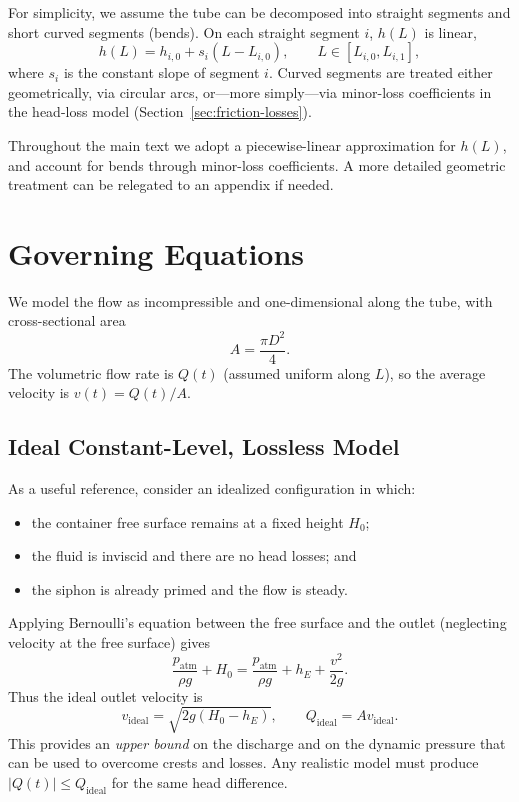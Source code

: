 \documentclass[11pt]{article}
\begin{document}
For simplicity, we assume the tube can be decomposed into straight segments and short curved segments (bends).
On each straight segment $i$, $h(L)$ is linear,
\begin{equation}
  h(L) = h_{i,0} + s_i (L - L_{i,0}), \qquad L \in [L_{i,0}, L_{i,1}],
\end{equation}
where $s_i$ is the constant slope of segment $i$.
Curved segments are treated either geometrically, via circular arcs, or---more simply---via minor-loss coefficients in the head-loss model (Section~\ref{sec:friction-losses}).

Throughout the main text we adopt a piecewise-linear approximation for $h(L)$, and account for bends through minor-loss coefficients.
A more detailed geometric treatment can be relegated to an appendix if needed.

\section{Governing Equations}
\label{sec:governing-equations}

We model the flow as incompressible and one-dimensional along the tube, with cross-sectional area
\begin{equation}
  A = \frac{\pi D^2}{4}.
\end{equation}
The volumetric flow rate is $Q(t)$ (assumed uniform along $L$), so the average velocity is $v(t) = Q(t)/A$.

\subsection{Ideal Constant-Level, Lossless Model}
\label{sec:ideal-model}

As a useful reference, consider an idealized configuration in which:
\begin{itemize}
  \item the container free surface remains at a fixed height $H_0$;
  \item the fluid is inviscid and there are no head losses; and
  \item the siphon is already primed and the flow is steady.
\end{itemize}

Applying Bernoulli's equation between the free surface and the outlet (neglecting velocity at the free surface) gives
\begin{equation}
  \frac{p_{\text{atm}}}{\rho g} + H_0 = \frac{p_{\text{atm}}}{\rho g} + h_E + \frac{v^2}{2g}.
\end{equation}
Thus the ideal outlet velocity is
\begin{equation}
  v_{\text{ideal}} = \sqrt{2g (H_0 - h_E)}, \qquad
  Q_{\text{ideal}} = A v_{\text{ideal}}.
\end{equation}
This provides an \emph{upper bound} on the discharge and on the dynamic pressure that can be used to overcome crests and losses.
Any realistic model must produce $|Q(t)| \le Q_{\text{ideal}}$ for the same head difference.
\end{document}
